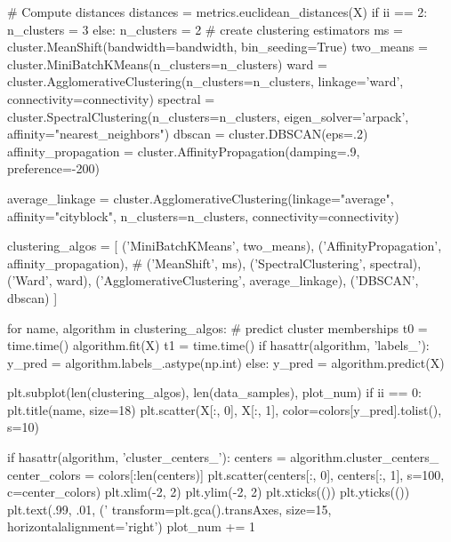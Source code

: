         # Compute distances
        distances = metrics.euclidean_distances(X)
        if ii == 2:
            n_clusters = 3
        else:
            n_clusters = 2
        # create clustering estimators
        ms = cluster.MeanShift(bandwidth=bandwidth, bin_seeding=True)
        two_means = cluster.MiniBatchKMeans(n_clusters=n_clusters)
        ward = cluster.AgglomerativeClustering(n_clusters=n_clusters,
                        linkage='ward', connectivity=connectivity)
        spectral = cluster.SpectralClustering(n_clusters=n_clusters,
                                              eigen_solver='arpack',
                                              affinity="nearest_neighbors")
        dbscan = cluster.DBSCAN(eps=.2)
        affinity_propagation = cluster.AffinityPropagation(damping=.9,
                                                           preference=-200)

        average_linkage = cluster.AgglomerativeClustering(linkage="average",
                                affinity="cityblock", n_clusters=n_clusters,
                                connectivity=connectivity)

        

        clustering_algos = [
                    ('MiniBatchKMeans', two_means),
                    ('AffinityPropagation', affinity_propagation),
        #           ('MeanShift', ms),
                    ('SpectralClustering', spectral),
                    ('Ward', ward),
                    ('AgglomerativeClustering', average_linkage),
                    ('DBSCAN', dbscan)
                   ]

        for name, algorithm in clustering_algos:
            # predict cluster memberships
            t0 = time.time()
            algorithm.fit(X)
            t1 = time.time()
            if hasattr(algorithm, 'labels_'):
                y_pred = algorithm.labels_.astype(np.int)
            else:
                y_pred = algorithm.predict(X)

            plt.subplot(len(clustering_algos), len(data_samples), plot_num)
            if ii == 0:
                plt.title(name, size=18)
            plt.scatter(X[:, 0], X[:, 1], color=colors[y_pred].tolist(), s=10)

            if hasattr(algorithm, 'cluster_centers_'):
                centers = algorithm.cluster_centers_
                center_colors = colors[:len(centers)]
                plt.scatter(centers[:, 0], centers[:, 1], s=100, c=center_colors)
            plt.xlim(-2, 2)
            plt.ylim(-2, 2)
            plt.xticks(())
            plt.yticks(())
            plt.text(.99, .01, ('%
                     transform=plt.gca().transAxes, size=15,
                     horizontalalignment='right')
            plot_num += 1

